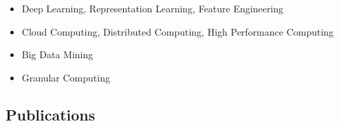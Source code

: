 \documentclass[10pt,a4paper]{article}
\begin{document}
\begin{itemize}
\itemsep1pt\parskip0pt
\item
  Deep Learning, Representation Learning, Feature Engineering
\item
  Cloud Computing, Distributed Computing, High Performance Computing
\item
  Big Data Mining
\item
  Granular Computing
\end{itemize}

\fi

\subsection{Publications}\label{publications}

\small
\end{document}
